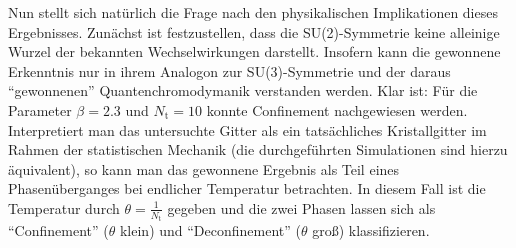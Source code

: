 Nun stellt sich natürlich die Frage nach den physikalischen Implikationen dieses
Ergebnisses. Zunächst ist festzustellen, dass die SU(2)-Symmetrie keine alleinige
Wurzel der bekannten Wechselwirkungen darstellt. Insofern kann die gewonnene
Erkenntnis nur in ihrem Analogon zur SU(3)-Symmetrie und der daraus
\enquote{gewonnenen} Quantenchromodymanik verstanden werden. Klar ist: Für die
Parameter $\beta = 2.3$ und $N_\text{t} = 10$ konnte Confinement nachgewiesen
werden. Interpretiert man das untersuchte Gitter als ein tatsächliches
Kristallgitter im Rahmen der statistischen Mechanik (die durchgeführten
Simulationen sind hierzu äquivalent), so kann man das gewonnene Ergebnis als Teil
eines Phasenüberganges bei endlicher Temperatur betrachten. In diesem Fall ist die
Temperatur durch $\theta = \frac{1}{N_\text{t}}$ gegeben und die zwei Phasen
lassen sich als \enquote{Confinement} ($\theta$ klein) und \enquote{Deconfinement}
($\theta$ groß) klassifizieren.

